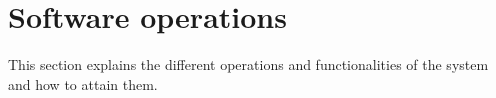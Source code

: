 \chapter{Software operations}
\label{chap:soptware_operations}

This section explains the different operations and functionalities of the system
and how to attain them.








